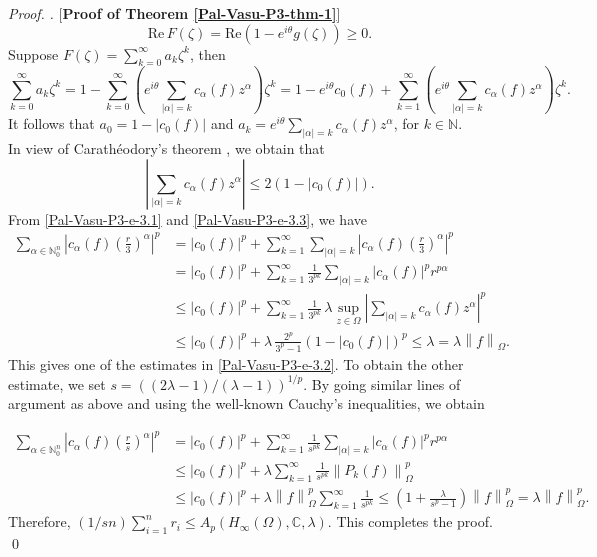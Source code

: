 \documentclass[a4paper,12pt]{amsart}
\theoremstyle{definition}
\newcounter {own}
\newenvironment{pf}[1][]{%
 \vskip 3mm
 \noindent
 \ifthenelse{\equal{#1}{}}%
  {{\slshape Proof. }}%
  {{\slshape #1.} }%
 }%
{\qed\bigskip}
\newcommand{\norm}[1]{\left\lVert#1\right\rVert}
\begin{document}
\begin{pf} [{\bf Proof of Theorem \ref{Pal-Vasu-P3-thm-1}}]
	\begin{equation*}
		\mbox{Re} \, F(\zeta)=\mbox{Re} \left(1-e^{i\theta}g(\zeta)\right)\geq 0.
	\end{equation*}
	Suppose $F(\zeta)=\sum_{k=0}^{\infty}a_k\zeta^k$, then 
	\begin{equation*}
		\sum_{k=0}^{\infty}a_k\zeta^k=1-\sum_{k=0}^{\infty}\left(e^{i\theta}\sum_{|\alpha|=k}c_{\alpha}(f)z^{\alpha}\right)\zeta^k=1-e^{i\theta}c_0(f)+ \sum_{k=1}^{\infty}\left(e^{i\theta}\sum_{|\alpha|=k}c_{\alpha}(f)z^{\alpha}\right)\zeta^k.
	\end{equation*}
	It follows that $a_0=1-|c_0(f)|$ and $a_k=e^{i\theta}\sum_{|\alpha|=k}c_{\alpha}(f)z^{\alpha}$, for $k\in \mathbb{N}.$\\[2mm]
	In view of Carath\'eodory's theorem \cite{aizn-2005}, we obtain that 
	\begin{equation}\label{Pal-Vasu-P3-e-3.3}
		\left|\sum_{|\alpha|=k}c_{\alpha}(f)z^{\alpha}\right|\leq 2(1-|c_0(f)|).
	\end{equation}
	From \eqref{Pal-Vasu-P3-e-3.1} and \eqref{Pal-Vasu-P3-e-3.3}, we have
	\begin{align*}
		\sum_{\alpha\in \mathbb{N}^n_{0}}\left|c_{\alpha}(f)\left(\frac{r}{3}\right)^{\alpha}\right|^p & =
		|c_0(f)|^p+\sum_{k=1}^{\infty}\sum_{|\alpha|=k}\left|c_{\alpha}(f)\left(\frac{r}{3}\right)^{\alpha}\right|^p\\ & = |c_0(f)|^p +\sum_{k=1}^{\infty} \frac{1}{3^{pk}} \sum_{|\alpha|=k} |c_{\alpha}(f)|^p r^{p\alpha}\\ &\leq |c_0(f)|^p + \sum_{k=1}^{\infty} \frac{1}{3^{pk}}\, \lambda \sup_{z\in \Omega} \left|\sum_{|\alpha|=k}c_{\alpha}(f)z^{\alpha}\right|^p\\ & \leq 
		|c_0(f)|^p+ \lambda\, \frac{2^p}{3^p-1}\left(1-|c_0(f)|\right)^p \leq \lambda=\lambda \norm{f}_{\Omega}.
	\end{align*}
	This gives one of the estimates in \eqref{Pal-Vasu-P3-e-3.2}. To obtain the other estimate, we set $s=({(2\lambda-1)}/{(\lambda-1)})^{1/p}.$ By going similar lines of argument as above and using the well-known Cauchy's inequalities, we obtain
	
	\begin{align*}
		\sum_{\alpha\in \mathbb{N}^n_{0}}\left|c_{\alpha}(f)\left(\frac{r}{s}\right)^{\alpha}\right|^p &= |c_0(f)|^p +\sum_{k=1}^{\infty} \frac{1}{s^{pk}} \sum_{|\alpha|=k} |c_{\alpha}(f)|^p r^{p\alpha}\\ & \leq |c_0(f)|^p + \lambda \sum_{k=1}^{\infty} \frac{1}{s^{pk}} \norm{P_k(f)}^p_{\Omega}\\ &\leq 
		|c_0(f)|^p+\lambda \norm{f}^p_{\Omega} \sum_{k=1}^{\infty}\frac{1}{s^{pk}} \leq \left(1+\frac{\lambda}{s^p-1}\right)\norm{f}^p_{\Omega}=\lambda \norm{f}^p_{\Omega}.
	\end{align*}
	Therefore, $(1/sn)\sum_{i=1}^{n}r_i\leq A_p(H_{\infty}(\Omega), \mathbb{C},\lambda).$ This completes the proof.
\end{pf}
\end{document}
